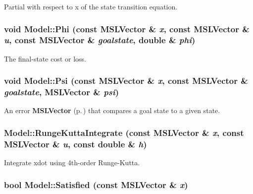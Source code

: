 Partial with respect to x of the state transition equation.

\subsubsection{\setlength{\rightskip}{0pt plus 5cm}void Model::Phi (const {\bf MSLVector} \& {\em x}, const {\bf MSLVector} \& {\em u}, const {\bf MSLVector} \& {\em goalstate}, double \& {\em phi})\hspace{0.3cm}{\tt  [inline, virtual]}}\label{class_Model_a15}


The final-state cost or loss.

\subsubsection{\setlength{\rightskip}{0pt plus 5cm}void Model::Psi (const {\bf MSLVector} \& {\em x}, const {\bf MSLVector} \& {\em goalstate}, {\bf MSLVector} \& {\em psi})\hspace{0.3cm}{\tt  [inline, virtual]}}\label{class_Model_a18}


An error {\bf MSLVector} {\rm (p.\,\pageref{class_MSLVector})} that compares a goal state to a given state.

\subsubsection{ Model::Runge\-Kutta\-Integrate (const {\bf MSLVector} \& {\em x}, const {\bf MSLVector} \& {\em u}, const double \& {\em h})\hspace{0.3cm}{\tt  [protected]}}\label{class_Model_b0}


Integrate xdot using 4th-order Runge-Kutta.

\subsubsection{\setlength{\rightskip}{0pt plus 5cm}bool Model::Satisfied (const {\bf MSLVector} \& {\em x})\hspace{0.3cm}{\tt  [virtual]}}\label{class_Model_a4}


